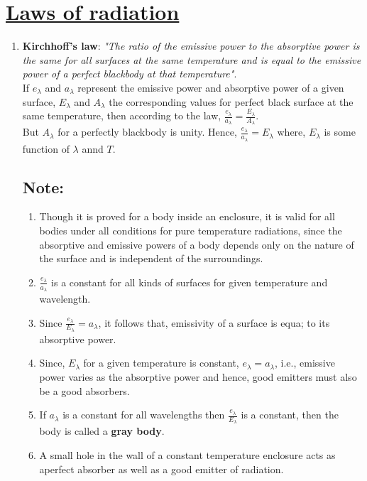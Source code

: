 \documentclass[14pt,a4paper]{article}
\begin{document}
\section{\underline{Laws of radiation}}
\begin{enumerate}
	\item \textbf{Kirchhoff's law}: \textit{"The ratio of the emissive power to the absorptive power is the same for all surfaces at the same temperature and is equal to the emissive power of a perfect blackbody at that temperature"}.
	\\
	If $e_{\lambda}$ and $a_{\lambda}$ represent the emissive power and absorptive power of a given surface, $E_{\lambda}$ and $A_{\lambda}$ the corresponding values for perfect black surface at the same temperature,
	then according to the law,
	$\frac{e_{\lambda}}{a_{\lambda}} = \frac{E_{\lambda}}{A_{\lambda}}$.
	\\
	But $A_{\lambda}$ for a perfectly blackbody is unity. Hence, $\frac{e_{\lambda}}{a_{\lambda}} = E_{\lambda} $ where, $E_{\lambda}$ is some function of $\lambda$ annd $T$.

\subsection{\textbf{Note}:}
\begin{enumerate}
	\item Though it is proved for a body inside an enclosure, it is valid for all bodies under all conditions for pure temperature radiations, since the absorptive and emissive powers of a body depends only on the nature of the surface and is independent of the surroundings.
	\item $\frac{e_{\lambda}}{a_{\lambda}}$ is a constant for all kinds of surfaces for given temperature and wavelength.
	\item Since $\frac{e_{\lambda}}{E_{\lambda}} = a_{\lambda}$, it follows that, emissivity of a surface is equa; to its absorptive power.
	\item Since, $E_{\lambda}$ for a given temperature is constant, $e_{\lambda}=a_{\lambda}$, i.e., emissive power varies as the absorptive power and hence, good emitters must also be a good absorbers.
	\item If $a_{\lambda}$ is a constant for all wavelengths then  $\frac{e_{\lambda}}{E_{\lambda}}$ is a constant, then the body is called a \textbf{gray body}.
	\item A small hole in the wall of a constant temperature enclosure acts as aperfect absorber as well as a good emitter of radiation.
\end{enumerate}


\end{enumerate}
\end{document}
